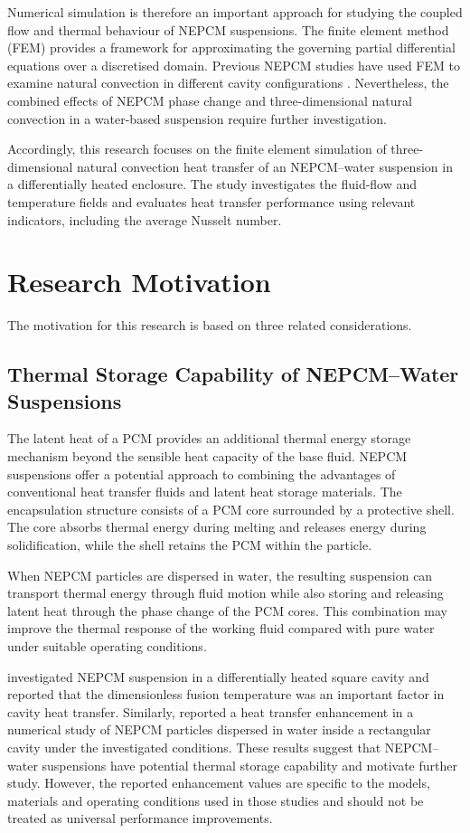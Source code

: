 Numerical simulation is therefore an important approach for studying the coupled flow and thermal behaviour of NEPCM suspensions. The finite element method (FEM) provides a framework for approximating the governing partial differential equations over a discretised domain. Previous NEPCM studies have used FEM to examine natural convection in different cavity configurations \citep{ghalambaz2019,ghalambaz2020}. Nevertheless, the combined effects of NEPCM phase change and three-dimensional natural convection in a water-based suspension require further investigation.

Accordingly, this research focuses on the finite element simulation of three-dimensional natural convection heat transfer of an NEPCM--water suspension in a differentially heated enclosure. The study investigates the fluid-flow and temperature fields and evaluates heat transfer performance using relevant indicators, including the average Nusselt number.

\section{Research Motivation}

The motivation for this research is based on three related considerations.

\subsection{Thermal Storage Capability of NEPCM--Water Suspensions}

The latent heat of a PCM provides an additional thermal energy storage mechanism beyond the sensible heat capacity of the base fluid. NEPCM suspensions offer a potential approach to combining the advantages of conventional heat transfer fluids and latent heat storage materials. The encapsulation structure consists of a PCM core surrounded by a protective shell. The core absorbs thermal energy during melting and releases energy during solidification, while the shell retains the PCM within the particle.

When NEPCM particles are dispersed in water, the resulting suspension can transport thermal energy through fluid motion while also storing and releasing latent heat through the phase change of the PCM cores. This combination may improve the thermal response of the working fluid compared with pure water under suitable operating conditions.

\citet{ghalambaz2019} investigated NEPCM suspension in a differentially heated square cavity and reported that the dimensionless fusion temperature was an important factor in cavity heat transfer. Similarly, \citet{golab2021} reported a heat transfer enhancement in a numerical study of NEPCM particles dispersed in water inside a rectangular cavity under the investigated conditions. These results suggest that NEPCM--water suspensions have potential thermal storage capability and motivate further study. However, the reported enhancement values are specific to the models, materials and operating conditions used in those studies and should not be treated as universal performance improvements.

